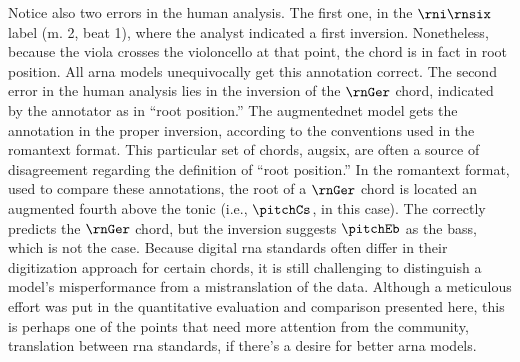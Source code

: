 Notice also two errors in the human analysis. The first one,
in the $\rni\rnsix$ label (m. 2, beat 1), where the analyst
indicated a first inversion. Nonetheless, because the viola
crosses the violoncello at that point, the chord is in fact
in root position. All \gls{arna} models unequivocally get
this annotation correct. The second error in the human
analysis lies in the inversion of the $\rnGer$ chord,
indicated by the annotator as in ``root position.'' The
\gls{augmentednet} model gets the annotation in the proper
inversion, according to the conventions used in the
\gls{romantext} format. This particular set of chords,
\gls{augsix}, are often a source of disagreement regarding
the definition of ``root position.'' In the \gls{romantext}
format, used to compare these annotations, the root of a
$\rnGer$ chord is located an augmented fourth above the
tonic (i.e., $\pitchCs$, in this case). The
\textcite{micchi2021deep} correctly predicts the $\rnGer$
chord, but the inversion suggests $\pitchEb$ as the bass,
which is not the case. Because digital \gls{rna} standards
often differ in their digitization approach for certain
chords, it is still challenging to distinguish a model's
misperformance from a mistranslation of the data. Although a
meticulous effort was put in the quantitative evaluation and
comparison presented here, this is perhaps one of the points
that need more attention from the community, translation
between \gls{rna} standards, if there's a desire for better
\gls{arna} models.